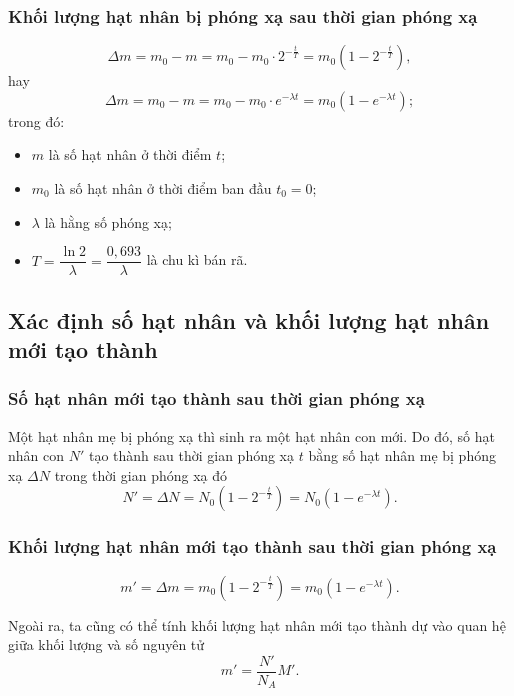 	\subsubsection{Khối lượng hạt nhân bị phóng xạ sau thời gian phóng xạ}
	\begin{equation}
	\Delta m = m_0 - m = m_0 - m_0\cdot 2^{-\frac{t}{T}} = m_0\left( 1-2^{-\frac{t}{T}}\right),
	\end{equation}
	hay
	\begin{equation}
	\Delta m = m_0 - m = m_0 - m_0\cdot e^{-\lambda t} = m_0\left( 1-e^{-\lambda t}\right);
	\end{equation}
	trong đó:
	\begin{itemize}
		\item $m$ là số hạt nhân ở thời điểm $t$;
		\item $m_0$ là số hạt nhân ở thời điểm ban đầu $t_0=0$;
		\item $\lambda$ là hằng số phóng xạ;
		\item $T=\dfrac{\ln2}{\lambda}=\dfrac{0,693}{\lambda}$ là chu kì bán rã.
	\end{itemize}


\subsection{Xác định số hạt nhân và khối lượng hạt nhân mới tạo thành}

	\subsubsection{Số hạt nhân mới tạo thành sau thời gian phóng xạ}	
	Một hạt nhân mẹ bị phóng xạ thì sinh ra một hạt nhân con mới. Do đó, số hạt nhân con $N'$ tạo thành sau thời gian phóng xạ $t$ bằng số hạt nhân mẹ bị phóng xạ $\Delta N$ trong thời gian phóng xạ đó	
	\begin{equation}
	N'=\Delta N = N_0\left( 1-2^{-\frac{t}{T}}\right)=N_0\left( 1-e^{-\lambda t}\right).
	\end{equation}
	\subsubsection{Khối lượng hạt nhân mới tạo thành sau thời gian phóng xạ}
	\begin{equation}
	m'=\Delta m = m_0\left( 1-2^{-\frac{t}{T}}\right)=m_0\left( 1-e^{-\lambda t}\right).
	\end{equation}
	
	Ngoài ra, ta cũng có thể tính khối lượng hạt nhân mới tạo thành dự vào quan hệ giữa khối lượng và số nguyên tử
	\begin{equation}
	m'=\dfrac{N'}{N_A}M'.
	\end{equation}
	
